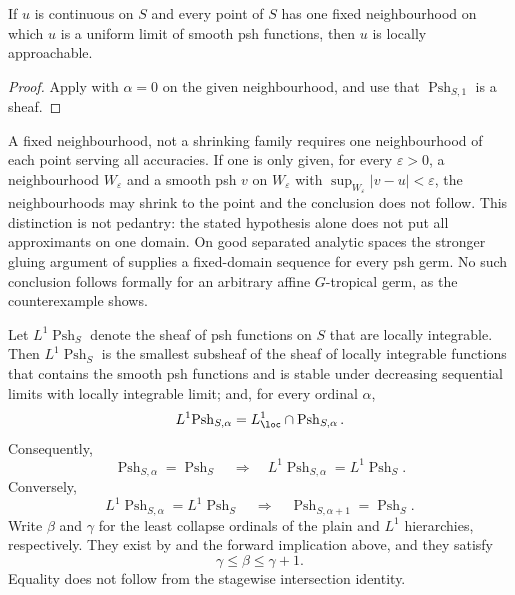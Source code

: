 \begin{corollary}
\label{cor:ch15-uniform-approachable}
If $u$ is continuous on $S$ and every point of $S$ has one fixed
neighbourhood on which $u$ is a uniform limit of smooth psh functions, then
$u$ is locally approachable.
\end{corollary}

\begin{proof}
Apply  with $\alpha=0$ on the given
neighbourhood, and use that $\operatorname{Psh}_{S,1}$ is a sheaf.
\end{proof}

\begin{warning}{A fixed neighbourhood, not a shrinking family}
 requires one neighbourhood of each point
serving all accuracies.  If one is only given, for every $\varepsilon>0$, a
neighbourhood $W_\varepsilon$ and a smooth psh $v$ on $W_\varepsilon$ with
$\sup_{W_\varepsilon}|v-u|<\varepsilon$, the neighbourhoods may shrink to the
point and the conclusion does not follow.  This distinction is not pedantry:
the stated hypothesis alone does not put all approximants on one domain.  On
good separated analytic spaces the stronger gluing argument of
 supplies a fixed-domain
sequence for every psh germ.  No such conclusion follows formally for an
arbitrary affine $G$-tropical germ, as the counterexample
 shows.
\end{warning}

\begin{proposition}
\label{prop:ch15-L1-hierarchy}
Let $L^1\!\operatorname{Psh}_S$ denote the sheaf of psh functions on $S$ that
are locally integrable.  Then $L^1\!\operatorname{Psh}_S$ is the smallest
subsheaf of the sheaf of locally integrable functions that contains the
smooth psh functions and is stable under decreasing sequential limits with
locally integrable limit; and, for every ordinal $\alpha$,
\[
 L^1\!\operatorname{Psh}_{S,\alpha}
 =L^1_{\loc}\cap\operatorname{Psh}_{S,\alpha} .
\]
Consequently,
\[
 \operatorname{Psh}_{S,\alpha}=\operatorname{Psh}_S
 \quad\Longrightarrow\quad
 L^1\!\operatorname{Psh}_{S,\alpha}
   =L^1\!\operatorname{Psh}_S .
\]
Conversely,
\[
 L^1\!\operatorname{Psh}_{S,\alpha}
   =L^1\!\operatorname{Psh}_S
 \quad\Longrightarrow\quad
 \operatorname{Psh}_{S,\alpha+1}=\operatorname{Psh}_S .
\]
Write $\beta$ and $\gamma$ for the least collapse ordinals of the plain and
$L^1$ hierarchies, respectively.  They exist by
 and the forward implication above, and
they satisfy
\[
                         \gamma\leq\beta\leq\gamma+1.
\]
Equality does not follow from the stagewise intersection identity.
\end{proposition}

